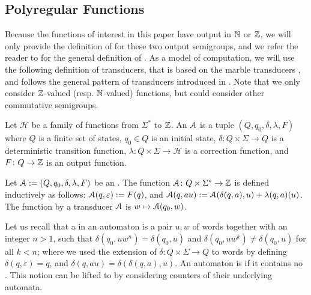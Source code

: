 \subsection{Polyregular Functions}

\AP Because the functions of interest in this paper have output in $\mathbb{N}$ or
$\mathbb{Z}$, we will only provide the definition of  for
these two output semigroups, and we refer the reader to \cite{BOKL19} for the
general definition of . As a model of computation, we
will use the following definition of transducers, that is based on the marble
transducers \cite{EHB99}, and follows the general pattern of transducers
introduced in \cite{CDTL23}. Note that we only consider $\mathbb{Z}$-valued (resp.
$\mathbb{N}$-valued) functions, but could consider other commutative semigroups.

\begin{definition}
    Let $\mathcal{H}$ be a family of functions
    from $\Sigma^*$ to $\mathbb{Z}$.
    An  $\mathcal{A}$ is
    a tuple $(Q, q_0, \delta, \lambda, F)$ where
         $Q$ is a finite set of states,
         $q_0 \in Q$ is an initial state,
         $\delta \colon Q \times \Sigma \to Q$
            is a deterministic transition function,
         $\lambda \colon Q \times \Sigma \to \mathcal{H}$
            is a correction function,
         and $F \colon Q \to \mathbb{Z}$ is an output function.
\end{definition}

\begin{definition}
    Let $\mathcal{A} \mathrel{:=} (Q,q_0, \delta, \lambda, F)$ be an .
    The function
    $\mathcal{A} \colon Q \times \Sigma^* \to \mathbb{Z}$
    is defined inductively as follows:
        $\mathcal{A}(q, \varepsilon) \mathrel{:=} F(q)$, and
        $\mathcal{A}(q, a u) \mathrel{:=} \mathcal{A}(\delta(q,a), u)
            + \lambda(q,a)(u)$.
    The function  by a transducer $\mathcal{A}$
    is $w \mapsto \mathcal{A}(q_0, w)$.
\end{definition}

\AP Let us recall that a  in an automaton is a pair $u,w$ of
words together with an integer $n > 1$, such that $\delta(q_0, uw^n) =
\delta(q_0, u)$ and $\delta(q_0, u w^k) \neq \delta(q_0, u)$ for all $k < n$;
where we used the extension of $\delta \colon Q \times \Sigma \to Q$ to words
by defining $\delta(q, \varepsilon) = q$, and $\delta(q,au) =
\delta(\delta(q,a), u)$. An automaton is  if it contains
no . This notion can be lifted to
 by considering counters of their underlying
automata. 

